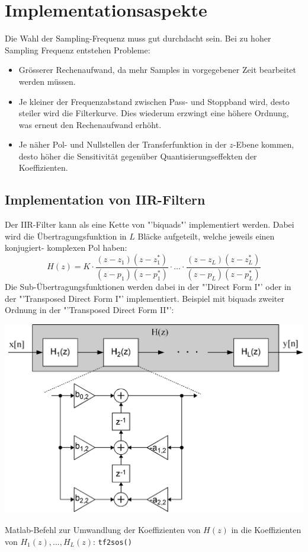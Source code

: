 \section{Implementationsaspekte}
Die Wahl der Sampling-Frequenz muss gut durchdacht sein. Bei zu hoher Sampling Frequenz entstehen Probleme:
\begin{itemize}[noitemsep,topsep=3pt]
	\item Grösserer Rechenaufwand, da mehr Samples in vorgegebener Zeit bearbeitet werden müssen.
	\item Je kleiner der Frequenzabstand zwischen Pass- und Stoppband wird, desto steiler wird die Filterkurve. 
	Dies wiederum erzwingt eine höhere Ordnung, was erneut den Rechenaufwand erhöht.
	\item Je näher Pol- und Nullstellen der Transferfunktion in der $z$-Ebene kommen, desto höher die Sensitivität 
	gegenüber Quantisierungseffekten der Koeffizienten. 
\end{itemize}
\subsection{Implementation von IIR-Filtern}
Der IIR-Filter kann als eine Kette von "'biquads"' implementiert werden. Dabei wird die
Übertragungsfunktion in $L$ Bläcke aufgeteilt, welche jeweils einen konjugiert-
komplexen Pol haben:
\[ H(z) = K \cdot \frac{(z-z_1)(z-z_1^*)}{(z-p_1)(z-p_1^*)}\cdot\ldots\cdot
	\frac{(z-z_L)(z-z_L^*)}{(z-p_L)(z-p_L^*)} \]
Die Sub-Übertragungsfunktionen werden dabei in der "'Direct Form I"' oder in der "'Transposed 
Direct Form I"' implementiert. Beispiel mit biquads zweiter Ordnung in der "'Transposed Direct 
Form II"':
\begin{center}
	\includegraphics[width=.65\textwidth]{../fig/iir_implementation_biquads}
\end{center}
Matlab-Befehl zur Umwandlung der Koeffizienten von $H(z)$ in die Koeffizienten von $H_1(z), ..., H_L(z)$: \verb|tf2sos()|
